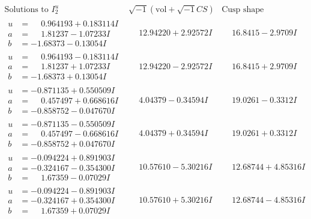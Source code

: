 \documentclass[1p]{elsarticle_modified}
\theoremstyle{definition}
\newcommand{\I}{\sqrt{-1}}
\begin{document}
$$\begin{array}{c|c|c}  
\text{Solutions to }I^u_{2}& \I (\text{vol} + \sqrt{-1}CS) & \text{Cusp shape}\\
 \hline 
\begin{aligned}
u &= \phantom{-}0.964193 + 0.183114 I \\
a &= \phantom{-}1.81237 - 1.07233 I \\
b &= -1.68373 - 0.13054 I\end{aligned}
 & \phantom{-}12.94220 + 2.92572 I & \phantom{-}16.8415 - 2.9709 I \\ \hline\begin{aligned}
u &= \phantom{-}0.964193 - 0.183114 I \\
a &= \phantom{-}1.81237 + 1.07233 I \\
b &= -1.68373 + 0.13054 I\end{aligned}
 & \phantom{-}12.94220 - 2.92572 I & \phantom{-}16.8415 + 2.9709 I \\ \hline\begin{aligned}
u &= -0.871135 + 0.550509 I \\
a &= \phantom{-}0.457497 + 0.668616 I \\
b &= -0.858752 - 0.047670 I\end{aligned}
 & \phantom{-}4.04379 - 0.34594 I & \phantom{-}19.0261 - 0.3312 I \\ \hline\begin{aligned}
u &= -0.871135 - 0.550509 I \\
a &= \phantom{-}0.457497 - 0.668616 I \\
b &= -0.858752 + 0.047670 I\end{aligned}
 & \phantom{-}4.04379 + 0.34594 I & \phantom{-}19.0261 + 0.3312 I \\ \hline\begin{aligned}
u &= -0.094224 + 0.891903 I \\
a &= -0.324167 - 0.354300 I \\
b &= \phantom{-}1.67359 - 0.07029 I\end{aligned}
 & \phantom{-}10.57610 - 5.30216 I & \phantom{-}12.68744 + 4.85316 I \\ \hline\begin{aligned}
u &= -0.094224 - 0.891903 I \\
a &= -0.324167 + 0.354300 I \\
b &= \phantom{-}1.67359 + 0.07029 I\end{aligned}
 & \phantom{-}10.57610 + 5.30216 I & \phantom{-}12.68744 - 4.85316 I \\ \hline\begin{aligned}

\end{aligned}
\end{array}$$
\end{document}
